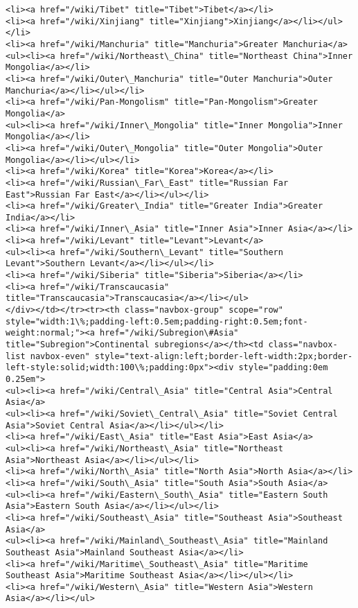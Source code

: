\documentclass[11pt]{article}
\begin{document}
\begin{Verbatim}[commandchars=\\\{\}]
<li><a href="/wiki/Tibet" title="Tibet">Tibet</a></li>
<li><a href="/wiki/Xinjiang" title="Xinjiang">Xinjiang</a></li></ul></li>
<li><a href="/wiki/Manchuria" title="Manchuria">Greater Manchuria</a>
<ul><li><a href="/wiki/Northeast\_China" title="Northeast China">Inner Mongolia</a></li>
<li><a href="/wiki/Outer\_Manchuria" title="Outer Manchuria">Outer Manchuria</a></li></ul></li>
<li><a href="/wiki/Pan-Mongolism" title="Pan-Mongolism">Greater Mongolia</a>
<ul><li><a href="/wiki/Inner\_Mongolia" title="Inner Mongolia">Inner Mongolia</a></li>
<li><a href="/wiki/Outer\_Mongolia" title="Outer Mongolia">Outer Mongolia</a></li></ul></li>
<li><a href="/wiki/Korea" title="Korea">Korea</a></li>
<li><a href="/wiki/Russian\_Far\_East" title="Russian Far East">Russian Far East</a></li></ul></li>
<li><a href="/wiki/Greater\_India" title="Greater India">Greater India</a></li>
<li><a href="/wiki/Inner\_Asia" title="Inner Asia">Inner Asia</a></li>
<li><a href="/wiki/Levant" title="Levant">Levant</a>
<ul><li><a href="/wiki/Southern\_Levant" title="Southern Levant">Southern Levant</a></li></ul></li>
<li><a href="/wiki/Siberia" title="Siberia">Siberia</a></li>
<li><a href="/wiki/Transcaucasia" title="Transcaucasia">Transcaucasia</a></li></ul>
</div></td></tr><tr><th class="navbox-group" scope="row" style="width:1\%;padding-left:0.5em;padding-right:0.5em;font-weight:normal;"><a href="/wiki/Subregion\#Asia" title="Subregion">Continental subregions</a></th><td class="navbox-list navbox-even" style="text-align:left;border-left-width:2px;border-left-style:solid;width:100\%;padding:0px"><div style="padding:0em 0.25em">
<ul><li><a href="/wiki/Central\_Asia" title="Central Asia">Central Asia</a>
<ul><li><a href="/wiki/Soviet\_Central\_Asia" title="Soviet Central Asia">Soviet Central Asia</a></li></ul></li>
<li><a href="/wiki/East\_Asia" title="East Asia">East Asia</a>
<ul><li><a href="/wiki/Northeast\_Asia" title="Northeast Asia">Northeast Asia</a></li></ul></li>
<li><a href="/wiki/North\_Asia" title="North Asia">North Asia</a></li>
<li><a href="/wiki/South\_Asia" title="South Asia">South Asia</a>
<ul><li><a href="/wiki/Eastern\_South\_Asia" title="Eastern South Asia">Eastern South Asia</a></li></ul></li>
<li><a href="/wiki/Southeast\_Asia" title="Southeast Asia">Southeast Asia</a>
<ul><li><a href="/wiki/Mainland\_Southeast\_Asia" title="Mainland Southeast Asia">Mainland Southeast Asia</a></li>
<li><a href="/wiki/Maritime\_Southeast\_Asia" title="Maritime Southeast Asia">Maritime Southeast Asia</a></li></ul></li>
<li><a href="/wiki/Western\_Asia" title="Western Asia">Western Asia</a></li></ul>

\end{Verbatim}
\end{document}
